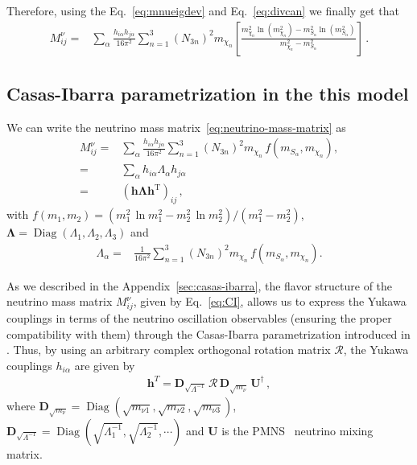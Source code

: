 Therefore, using the Eq.~\eqref{eq:mnueigdev} and Eq.~\eqref{eq:divcan} we finally get that
\begin{align}
\label{eq:neutrino-mass-matrix}
M^{\nu}_{ij}=&\sum_{\alpha}\frac{h_{i\alpha}h_{j\alpha}}{16\pi^2}\sum_{n=1}^3 \left( N_{3n} \right)^2m_{\chi_n}
\left[ \frac{m_{\chi_n}^2\ln \left( m_{\chi_n}^2 \right)-m_{S_\alpha}^2\ln \left( m_{S_\alpha}^2 \right)}{m_{\chi_n}^2-m_{S_\alpha}^2} \right]\,.
\end{align}

\subsection{Casas-Ibarra parametrization in the this model}
We can write the neutrino mass matrix~\eqref{eq:neutrino-mass-matrix} as 
%
\begin{align}
   M^{\nu}_{ij}=&\sum_{\alpha}\frac{h_{i\alpha}h_{j\alpha}}{16\pi^2}\sum_{n=1}^3 \left( N_{3n} \right)^2m_{\chi_n}
\,f\left( m_{S_\alpha},m_{\chi_n} \right) ,\\\label{eq:Mnuij}
=&\sum_{\alpha} h_{i\alpha} \Lambda_{\alpha} h_{j\alpha}\\\label{eq:CI}
=&\left( \mathbf{h}\mathbf{\Lambda}\mathbf{h}^{\operatorname{T}} \right)_{ij}\,,
\end{align}
with
$f \left( m_1,m_2 \right)= (m_1^2\,\ln  m_1^2 -m_2^2\,\ln m_2^2 )/(m_1^2-m_2^2)$, $\boldsymbol{\Lambda}=\operatorname{Diag}\left(\Lambda_1,\Lambda_2,\Lambda_3\right)$ and
\begin{align}
\label{eq:Lambda}
  \Lambda_\alpha=&\frac{1}{16\pi^2}\sum_{n=1}^3 \left( N_{3n} \right)^2m_{\chi_n}\,f\left( m_{S_\alpha},m_{\chi_n} \right).
\end{align}

As we described in the Appendix~\ref{sec:casas-ibarra}, the flavor structure of the neutrino mass matrix $M^{\nu}_{ij}$, given
by Eq.~\eqref{eq:CI}, allows us to express the Yukawa couplings in
terms of the neutrino oscillation observables (ensuring the proper
compatibility with them) through the Casas-Ibarra parametrization introduced in
\cite{Casas:2001sr,Ibarra:2003up}. 
Thus, by using an arbitrary complex orthogonal rotation matrix
$\boldsymbol{\mathcal{R}}$, the Yukawa couplings $h_{i\alpha}$ are
given by
\begin{align}
  \label{eq:ht}
  \mathbf{h}^{T}=\mathbf{D}_{\sqrt{{\Lambda}^{-1}}}\,\boldsymbol{\mathcal{R}}\,\mathbf{D}_{\sqrt{m_{\nu}}}\,\mathbf{U}^{\dagger} \,,
\end{align}
where $\mathbf{D}_{\sqrt{m_\nu}}=\operatorname{Diag}
\left(\sqrt{m_{\nu 1}} , \sqrt{m_{\nu2}},\sqrt{m_{\nu3}}\right)$,
$\mathbf{D}_{\sqrt{\Lambda^{-1}}}=\operatorname{Diag}
\left(\sqrt{\Lambda_1^{-1}} , \sqrt{\Lambda_2^{-1}},\cdots\right)$ and
$\mathbf{U}$ is the PMNS~\cite{Maki:1962mu} neutrino mixing matrix.

